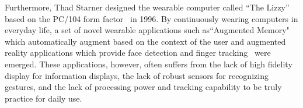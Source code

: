 Furthermore, Thad Starner designed the wearable computer called ``The Lizzy'' based on the PC/104 form factor~\cite{starner1997augmented} in 1996. By continuously wearing computers in everyday life, a set of novel wearable applications such as``Augmented Memory"~\cite{starner1997augmented} which automatically augment based on the context of the user and augmented reality applications which provide face detection and finger tracking~\cite{rhodes1997wearable} were emerged.  These applications, however, often suffers from the lack of high fidelity display for information displays, the lack of robust sensors for recognizing gestures, and the lack of processing power and tracking capability to be truly practice for daily use.





